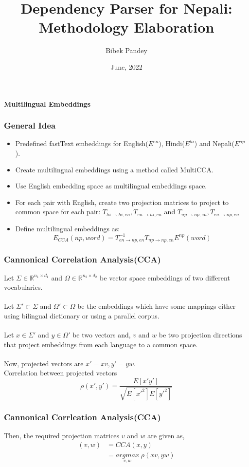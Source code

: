 \documentclass{beamer}
\title{Dependency Parser for Nepali: Methodology Elaboration}
\author{Bibek Pandey}
\institute{076MSCSK003}
\date{June, 2022}
\newcommand{\nn}{\\~\\}
\begin{document}
\begin{frame}
\titlepage
\end{frame}

\begin{frame}
\frametitle{}
\huge\textbf{Multilingual Embeddings}
\end{frame}

\begin{frame}
\frametitle{General Idea}
\begin{itemize}
\item Predefined fastText embeddings for English($E^{en}$), Hindi($E^{hi}$) and Nepali($E^{np}$).
\item Create multilingual embeddings using a method called MultiCCA.
\item Use English embedding space as multilingual embeddings space.
\item For each pair with English, create two projection matrices to project to common space for each pair: $T_{hi \rightarrow hi,en}, T_{en \rightarrow hi,en}$ and $T_{np \rightarrow np,en}, T_{en \rightarrow np,en}$
\item Define multilingual embeddings as:
    $$E_{CCA}(np, word) = T_{en \rightarrow np,en}^{-1}T_{np \rightarrow np,en}E^{np}(word)$$
\end{itemize}
\end{frame}

\begin{frame}
\frametitle{Cannonical Correlation Analysis(CCA)}
Let $\Sigma \in \mathbb{R}^{n_1 \times d_1}$ and $\Omega \in \mathbb{R}^{n_2 \times d_2}$ be vector space embeddings of two different vocabularies.
\nn
Let $\Sigma' \subset \Sigma$ and $\Omega' \subset \Omega$ be the embeddings which have some mappings either using bilingual dictionary or using a parallel corpus.
\nn
Let $x \in \Sigma'$ and $y \in \Omega'$ be two vectors and, $v$ and $w$ be two projection directions that project embeddings from each language to a common space.
\nn
Now, projected vectors are $x' = xv, y' = yw$. \\
Correlation between projected vectors
$$\rho(x', y') = \frac{E[x'y']}{\sqrt{E[x'^2]E[y'^2]}} $$
\end{frame}

\begin{frame}
\frametitle{Cannonical Corrleation Analysis(CCA)}
Then, the required projection matrices $v$ and $w$ are given as,
\begin{equation}
\begin{aligned}
(v, w) &= CCA(x, y) \\
&= \underset{v, w}{argmax} \; \rho(xv, yw)
\end{aligned}
\end{equation}
\end{frame}
\end{document}
